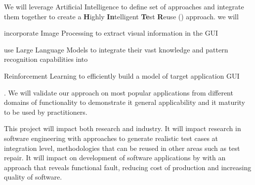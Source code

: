 
We will leverage Artificial Intelligence to define set of \testreuse approaches and integrate them together to create a \textbf{H}ighly \textbf{In}telligent \textbf{Te}st \textbf{R}euse (\project) approach.
we will
\begin{inparaenum}[(i)]
\item incorporate Image Processing to extract visual information in the GUI
\item use Large Language Models to integrate their vast knowledge and pattern recognition capabilities into \testreuse
\item Reinforcement Learning  to efficiently build a model of target application GUI
\end{inparaenum}.
We will validate our approach on most popular applications from different domains of functionality to demonstrate it general applicability and it maturity to be used by practitioners.   



This project will impact both research and industry. 
It will impact research in software engineering with approaches to generate realistic test cases at integration level, methodologies that can be reused in other areas such as test repair.
It will impact on development of software applications by with an approach that reveals functional fault, reducing cost of production and increasing quality of software. 









